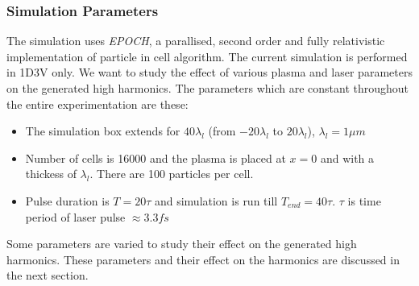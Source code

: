 \documentclass{beamer}
\begin{document}
\begin{frame}
    \frametitle{Simulation Parameters}
    \small
    The simulation uses \textit{EPOCH}, a parallised, second order and fully relativistic implementation of particle in cell algorithm.\cite{EPOCH} The current simulation is performed in 1D3V only. We want to study the effect of various plasma and laser parameters on the generated high harmonics. The parameters which are constant throughout the entire experimentation are these:
    \begin{itemize}
        \item The simulation box extends for $40 \lambda _l$ (from $-20 \lambda _l$ to $20 \lambda _l$), $\lambda_l = 1 \mu m$
        \item Number of cells is 16000 and the plasma is placed at $x=0$ and with a thickess of $\lambda_l$. There are 100 particles per cell.
        \item Pulse duration is  $T = 20 \tau$ and simulation is run till $T_{end} = 40 \tau$. $\tau$ is time period of laser pulse $\approx 3.3 fs$
    \end{itemize}
    Some parameters are varied to study their effect on the generated high harmonics. These parameters and their effect on the harmonics are discussed in the next section.

\end{frame}
\end{document}
